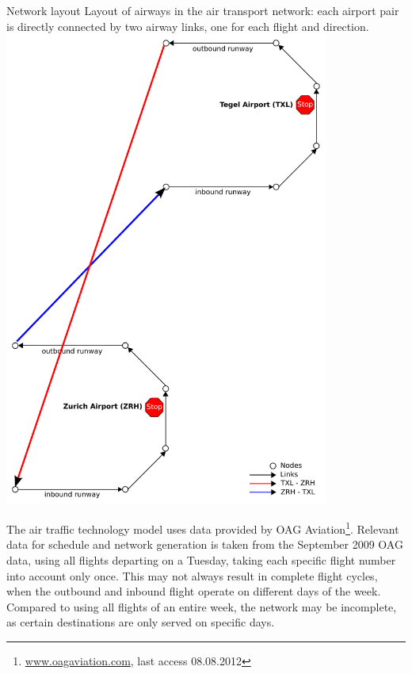 {\citet{Grether2014PhD}}
%
%
\createfigure%
{Network layout}%
{Layout of airways in the air transport network: each airport pair is directly connected by two airway links, one for each flight and direction. }%
{\label{fig:air_network_model}}
{\includegraphics[width=0.8\textwidth]{extending/figures/air/sf_airport_network_no_slide.pdf}}%
{}

The air traffic technology model uses data provided by OAG  Aviation\footnote{\url{www.oagaviation.com}, last access 08.08.2012}. 
Relevant data for schedule and network generation is taken from the September 2009 OAG  data, using all flights departing on a Tuesday, taking each specific flight number into account only once.
This may not always result in complete flight cycles, \eg when the outbound and inbound flight operate on different days of the week. 
Compared to using all flights of an entire week, the network may be incomplete, as certain destinations are only served on specific days.

